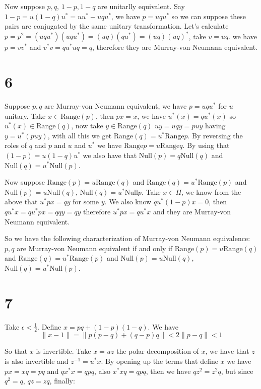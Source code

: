 \documentclass{article}
\begin{document}
Now suppose $p,q$, $1-p,1-q$ are unitarlly equivalent. Say $1-p=u(1-q)u^\ast=uu^\ast -uqu^\ast$, we have
$p=uqu^\ast$ so we can suppose these pairs are conjugated by the same unitary transformation. 
Let's calculate $p=p^2=(uqu^\ast)(uqu^\ast)=(uq)(qu^\ast)=(uq)(uq)^\ast $, take $v=uq$. we have $p=vv^\ast$
and $v^\ast v= qu^\ast u q=q$, therefore they are Murray-von Neumann equivalent.


\section*{6}

Suppose $p,q$ are Murray-von Neumann equivalent, we have $p=uqu^\ast$ for $u$ unitary. Take $x\in\text{Range}(p)$, then $px=x$,
we have $u^\ast(x)=qu^\ast(x)$ so $u^\ast(x)\in \text{Range}(q)$, now take $y\in \text{Range}(q)$ 
$uy=uqy=puy$ having $y=u^\ast(puy)$, with all this we get $\text{Range}(q)=u^\ast \text{Range}p$.
By reversing the roles of $q$ and $p$ and $u$ and $u^\ast$ we have $\text{Range}p=
u\text{Range}q$. By using that $(1-p)=u(1-q)u^\ast$ we also have that $\text{Null} (p)=q\text{Null}(q)$
and $\text{Null}(q)=u^\ast\text{Null}(p)$. 


Now suppose $\text{Range}(p)=u\text{Range}(q)$ and $\text{Range}(q)=u^\ast \text{Range}(p)$ 
and $\text{Null}(p)=u\text{Null}(q)$, $\text{Null}(q)=u^\ast\text{Null}{p}$.
Take $x\in H$, we know from the above that $u^\ast px=qy$ for some $y$. We also know 
$qu^\ast(1-p)x=0$, then $qu^\ast x=qu^\ast px=qqy=qy$ therefore $u^\ast px=qu^\ast x$ and they 
are Murray-von Neumann equivalent.


So we have the following characterization of Murray-von Neumann equivalence: $p,q$ are 
Murray-von Neumann equivalent if and only if $\text{Range}(p)=u\text{Range}(q)$ and $\text{Range}(q)=u^\ast \text{Range}(p)$ 
and $\text{Null}(p)=u\text{Null}(q)$, $\text{Null}(q)=u^\ast\text{Null}(p)$.


\section*{7}
Take $\epsilon<\frac{1}{2}$. Define $x=pq+(1-p)(1-q)$. We have 
\[  
\|x-1\|=\|p(p-q)+(q-p)q\|<2\|p-q\|<1    
\]

So that $x$ is invertible. Take $x=uz$ the polar decomposition of $x$, we have
that $z$ is also invertible and $z^{-1}=u^\ast x$. By opening up the terms
that define $x$ we have $px=xq=pq$ and $qx^\ast x=qpq$, also $x^\ast x q=qpq$,
then we have $qz^2=z^2q$, but since $q^2=q$, $qz=zq$, finally:
\end{document}
